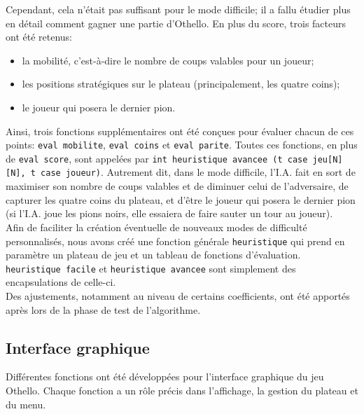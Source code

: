 \documentclass[12pt, a4paper, oneside]{article}
\begin{document}
        Cependant, cela n'était pas suffisant pour le mode difficile; il a fallu étudier plus en détail comment gagner une partie d'Othello.
        En plus du score, trois facteurs ont été retenus: \\
            \begin{itemize}
                \item la mobilité, c'est-à-dire le nombre de coups valables pour un joueur; 
                \item les positions stratégiques sur le plateau (principalement, les quatre coins);
                \item le joueur qui posera le dernier pion.
            \end{itemize}

        Ainsi, trois fonctions supplémentaires ont été conçues pour évaluer chacun de ces points: \texttt{eval\textunderscore
        mobilite}, \texttt{eval\textunderscore
        coins} et \texttt{eval\textunderscore
        parite}.
        Toutes ces fonctions, en plus de \texttt{eval\textunderscore
        score}, sont appelées par \texttt{int heuristique\textunderscore
        avancee (t\textunderscore
        case jeu[N][N], t\textunderscore
        case joueur)}. Autrement
        dit, dans le mode difficile, l'I.A. fait en sort de maximiser son nombre de coups valables et de diminuer celui de l'adversaire, de
        capturer les quatre coins du plateau, et d'être le joueur qui posera le dernier pion (si l'I.A. joue les pions noirs, elle essaiera
        de faire sauter un tour au joueur). \\

        Afin de faciliter la création éventuelle de nouveaux modes de difficulté personnalisés, nous avons créé une fonction générale \texttt{heuristique} 
        qui prend en paramètre un plateau de jeu et un tableau de fonctions d'évaluation. \texttt{heuristique\textunderscore
        facile} et \texttt{heuristique\textunderscore
        avancee} sont simplement 
        des encapsulations de celle-ci. \\

        Des ajustements, notamment au niveau de certains coefficients, ont été apportés après lors de la phase de test de l'algorithme. \\
        
    \subsection{Interface graphique}
        Différentes fonctions ont été développées pour l’interface graphique du jeu Othello. 
        Chaque fonction a un rôle précis dans l'affichage, la gestion du plateau et du menu. \\
\end{document}

